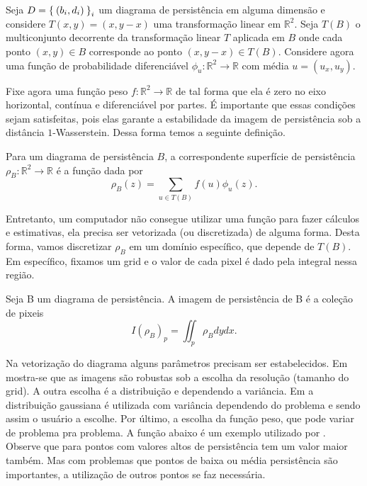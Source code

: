 Seja $D = \Set{(b_i,d_i)}_{i}$ um diagrama de persistência em alguma dimensão e considere $T(x,y) = (x, y-x)$ 
uma transformação linear em $\mathbb{R}^2$. Seja $T(B)$ o multiconjunto decorrente da transformação linear $T$
aplicada em $B$ onde cada ponto $(x,y) \in B$ corresponde ao ponto $(x,y-x) \in T(B)$. Considere agora uma 
função de probabilidade diferenciável $\phi_u\colon \mathbb{R}^2 \to \mathbb{R}$ com média $u=(u_x, u_y)$. 

Fixe agora uma função peso $f\colon \mathbb{R}^2 \to \mathbb{R}$ de tal forma que ela é zero no eixo horizontal,
contínua e diferenciável por partes. É importante que essas condições sejam satisfeitas, pois elas garante
a estabilidade da imagem de persistência sob a distância $1$-Wasserstein. Dessa forma temos a seguinte definição. 

\begin{defi}
    Para um diagrama de persistência $B$, a correspondente superfície de persistência $\rho_B \colon \mathbb{R}^2
    \to \mathbb{R}$ é a função dada por 
    \begin{equation*}
        \rho_B(z) = \sum_{u \in T(B)} f(u) \phi_u(z). 
    \end{equation*}
\end{defi}

Entretanto, um computador não consegue utilizar uma função para fazer cálculos e estimativas, ela precisa
ser vetorizada (ou discretizada) de alguma forma. Desta forma, vamos discretizar $\rho_B$ em um domínio específico,
que depende de $T(B)$. Em específico, fixamos um grid e o valor de cada pixel é dado pela integral nessa região.

\begin{defi}
    Seja B um diagrama de persistência. A imagem de persistência de B é a coleção de pixeis 
    \begin{equation*}
        I(\rho_B)_p = \iint_p \rho_B dydx.
    \end{equation*}
\end{defi}

Na vetorização do diagrama alguns parâmetros precisam ser estabelecidos. Em \cite{Adams2017} mostra-se que
as imagens são robustas sob a escolha da resolução (tamanho do grid). A outra escolha é a distribuição e dependendo
a variância. Em \cite{Adams2017} a distribuição gaussiana é utilizada com variância dependendo do problema e 
sendo assim o usuário a escolhe. Por último, a escolha da função peso, que pode variar de problema pra problema.
A função abaixo é um exemplo utilizado por \cite{Adams2017}. Observe que para pontos com valores altos de 
persistência tem um valor maior também. Mas com problemas que pontos de baixa ou média persistência são importantes,
a utilização de outros pontos se faz necessária. 

